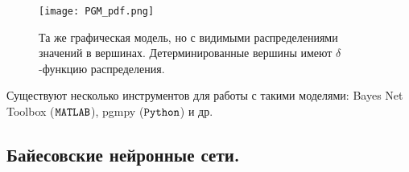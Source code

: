 \begin{figure}[H]
    \centering
    \texttt{[image: PGM\_pdf.png]}
    \caption{Та же графическая модель, но с видимыми распределениями значений в вершинах. Детерминированные вершины имеют $\delta$-функцию распределения.}
    \label{fig:PGM_pdf}
\end{figure}

Существуют несколько инструментов для работы с такими моделями: Bayes Net Toolbox ($\verb|MATLAB|$), pgmpy ($\verb|Python|$) и др.

\subsection{Байесовские нейронные сети.}
